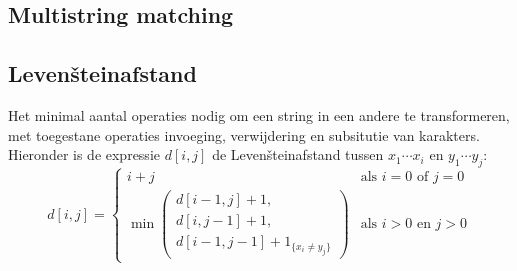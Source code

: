 \documentclass[10pt,a4paper,titlepage]{article}
\begin{document}


\subsection{Multistring matching}

\subsection{Levenšteinafstand}
Het minimal aantal operaties nodig om een string in een andere te transformeren, met toegestane operaties invoeging, verwijdering en subsitutie van karakters. Hieronder is de expressie $d[i,j]$ de Levenšteinafstand tussen $x_1\cdots x_i$ en $y_1\cdots y_j$:
\[ d[i,j] = \left\{\begin{array}{ll}
i+j & \text{als $i = 0$ of $j=0$} \\
\min\left(\begin{array}{c}d[i-1,j]+1,\\ d[i,j-1]+1,\\ d[i-1,j-1] + 1_{\{x_i \neq y_j\}}\end{array}\right) & \text{als $i > 0$ en $j>0$}
\end{array}\right.
\]
\end{document}
